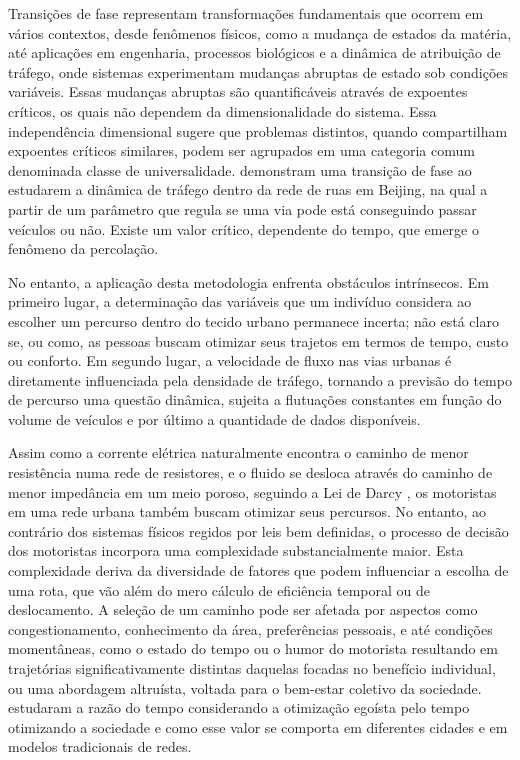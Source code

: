 \documentclass{article}
\begin{document}

Transições de fase representam transformações fundamentais que ocorrem em vários contextos, desde fenômenos físicos, como a mudança de estados da matéria, até aplicações em engenharia, processos biológicos e a dinâmica de atribuição de tráfego, onde sistemas experimentam mudanças abruptas de estado sob condições variáveis. Essas mudanças abruptas são quantificáveis através de expoentes críticos, os quais não dependem da dimensionalidade do sistema. Essa independência dimensional sugere que problemas distintos, quando compartilham expoentes críticos similares, podem ser agrupados em uma categoria comum denominada classe de universalidade. \citet{Li2014,Zeng2018} demonstram uma transição de fase ao estudarem a dinâmica de tráfego dentro da rede de ruas em Beijing, na qual a partir de um parâmetro que regula se uma via pode está conseguindo passar veículos ou não. Existe um valor crítico, dependente do tempo, que emerge o fenômeno da percolação. 

No entanto, a aplicação desta metodologia enfrenta obstáculos intrínsecos. Em primeiro lugar, a determinação das variáveis que um indivíduo considera ao escolher um percurso dentro do tecido urbano permanece incerta; não está claro se, ou como, as pessoas buscam otimizar seus trajetos em termos de tempo, custo ou conforto. Em segundo lugar, a velocidade de fluxo nas vias urbanas é diretamente influenciada pela densidade de tráfego, tornando a previsão do tempo de percurso uma questão dinâmica, sujeita a flutuações constantes em função do volume de veículos e por último a quantidade de dados disponíveis.


Assim como a corrente elétrica naturalmente encontra o caminho de menor resistência numa rede de resistores, e o fluido se desloca através do caminho de menor impedância em um meio poroso, seguindo a Lei de Darcy \citep{darcy}, os motoristas em uma rede urbana também buscam otimizar seus percursos. No entanto, ao contrário dos sistemas físicos regidos por leis bem definidas, o processo de decisão dos motoristas incorpora uma complexidade substancialmente maior. Esta complexidade deriva da diversidade de fatores que podem influenciar a escolha de uma rota, que vão além do mero cálculo de eficiência temporal ou de deslocamento. A seleção de um caminho pode ser afetada por aspectos como congestionamento, conhecimento da área, preferências pessoais, e até condições momentâneas, como o estado do tempo ou o humor do motorista resultando em trajetórias significativamente distintas daquelas focadas no benefício individual, ou uma abordagem altruísta, voltada para o bem-estar coletivo da sociedade. \citet{Anarchy} estudaram a razão do tempo considerando a otimização egoísta pelo tempo otimizando a sociedade e como esse valor se comporta em diferentes cidades e em modelos tradicionais de redes. 
\end{document}
